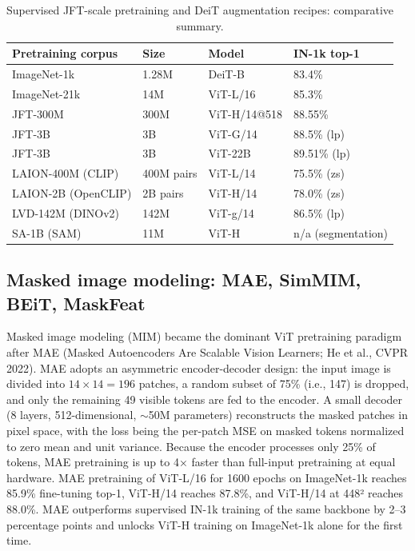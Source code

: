 \documentclass{article}
\begin{document}
\begin{table}[t]
\centering
\caption{Supervised JFT-scale pretraining and DeiT augmentation recipes: comparative summary.}
\label{tab:supervised-jft-scale-pretraining-and-deit-augmentation-recip}
\begin{tabular}{llll}
\toprule
Pretraining corpus & Size & Model & IN-1k top-1 \\
\midrule
ImageNet-1k & 1.28M & DeiT-B & 83.4\% \\
ImageNet-21k & 14M & ViT-L/16 & 85.3\% \\
JFT-300M & 300M & ViT-H/14@518 & 88.55\% \\
JFT-3B & 3B & ViT-G/14 & 88.5\% (lp) \\
JFT-3B & 3B & ViT-22B & 89.51\% (lp) \\
LAION-400M (CLIP) & 400M pairs & ViT-L/14 & 75.5\% (zs) \\
LAION-2B (OpenCLIP) & 2B pairs & ViT-H/14 & 78.0\% (zs) \\
LVD-142M (DINOv2) & 142M & ViT-g/14 & 86.5\% (lp) \\
SA-1B (SAM) & 11M & ViT-H & n/a (segmentation) \\
\end{tabular}
\end{table}

\subsection{Masked image modeling: MAE, SimMIM, BEiT, MaskFeat}\label{masked-image-modeling-mae-simmim-beit-maskfeat}

Masked image modeling (MIM) became the dominant ViT pretraining paradigm after MAE (Masked Autoencoders Are Scalable Vision Learners; He et al., CVPR 2022). MAE adopts an asymmetric encoder-decoder design: the input image is divided into \(14 \times 14 = 196\) patches, a random subset of 75\% (i.e., 147) is dropped, and only the remaining 49 visible tokens are fed to the encoder. A small decoder (8 layers, 512-dimensional, $\sim$50M parameters) reconstructs the masked patches in pixel space, with the loss being the per-patch MSE on masked tokens normalized to zero mean and unit variance. Because the encoder processes only 25\% of tokens, MAE pretraining is up to 4× faster than full-input pretraining at equal hardware. MAE pretraining of ViT-L/16 for 1600 epochs on ImageNet-1k reaches 85.9\% fine-tuning top-1, ViT-H/14 reaches 87.8\%, and ViT-H/14 at 448² reaches 88.0\%. MAE outperforms supervised IN-1k training of the same backbone by 2--3 percentage points and unlocks ViT-H training on ImageNet-1k alone for the first time.
\end{document}
